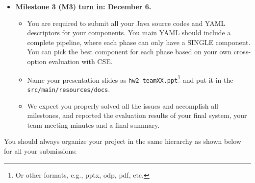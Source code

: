 \documentclass[oneside]{memoir}
\begin{document}
\begin{titlingpage}
\begin{minipage}{1.2\textwidth}
\begin{itemize}
\begin{itemize}
\end{itemize}

\end{itemize}

\end{minipage}
\hspace{-0.1\textwidth}

\hspace{-0.1\textwidth}
\begin{minipage}{1.2\textwidth}

\begin{itemize}

\item \textbf{Milestone 3 (M3) turn in: December 6.}

\begin{itemize}

\item You are required to submit all your Java source codes and YAML descriptors
for your components. You main YAML should include a complete pipeline, where
each phase can only have a SINGLE component. You can pick the best component for
each phase based on your own cross-option evaluation with CSE.

\item Name your presentation slides as
\texttt{hw2-teamXX.ppt}\footnote{Or other formats, e.g., pptx, odp, pdf, etc.}
and put it in the \texttt{src/main/resources/docs}.

\item We expect you properly solved all the issues and accomplish all
milestones, and reported the evaluation results of your final system, your team
meeting minutes and a final summary.

\end{itemize}

\end{itemize}

\end{minipage}
\hspace{-0.1\textwidth}

\hspace{-0.1\textwidth}
\begin{minipage}{1.2\textwidth}

You should always organize your project in the same hierarchy as shown
below for all your submissions:


\end{minipage}
\end{titlingpage}
\end{document}
